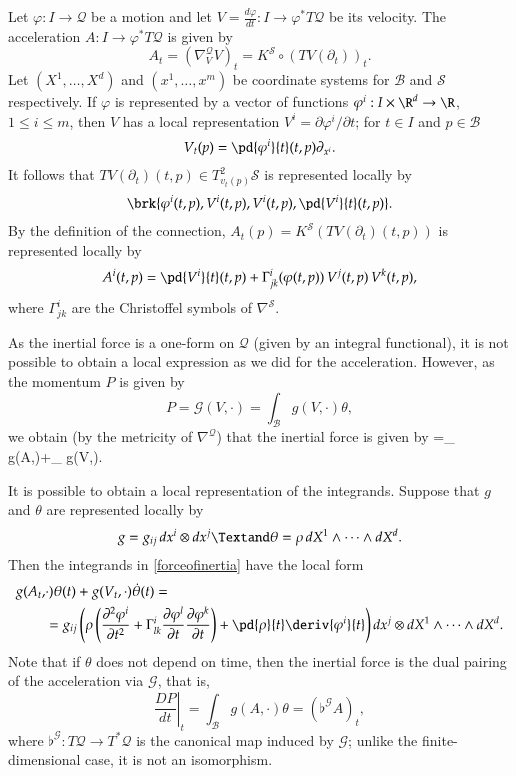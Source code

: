 \documentclass[smallextended]{svjour3}
\begin{document}
Let ${\varphi}:I\to{\mathcal{Q}}$ be a motion and let $V=\frac{d{\varphi}}{dt}:I\to {\varphi}^*T{\mathcal{Q}}$ be its velocity.  The acceleration $A:I\to {\varphi}^*T{\mathcal{Q}}$ is given by 
\[
A_t=(\nabla^{\mathcal{Q}}_VV)_t=K^{\mathcal{S}}\circ (TV(\partial_t))_t.
\]
Let $(X^1,\dots,X^d)$ and $(x^1,\dots,x^m)$ be coordinate systems for ${\mathcal{B}}$ and ${\mathcal{S}}$ respectively.  If ${\varphi}$ is represented by a vector of functions ${\varphi}^i:I\times\R^d\to\R$, $1\leq i\leq m$,  then $V$ has a local representation $V^i=\partial{\varphi}^i/\partial t$; for $t\in I$ and $p\in{\mathcal{B}}$
\[
V_t(p)=\pd{{\varphi}^i}{t}(t,p)\partial_{x^i}.
\]
It follows that $TV(\partial_t)(t,p)\in T^2_{v_t(p)}{\mathcal{S}}$ is represented locally by 
\[
\brk{{\varphi}^i(t,p),V^i(t,p),V^i(t,p), \pd{V^i}{t}(t,p)}.
\]
By the definition of the connection, $A_t(p)=K^{\mathcal{S}}(TV(\partial_t)(t,p))$ is represented locally by
\[
A^i(t,p)=\pd{V^i}{t}(t,p)+\Gamma^i_{jk}({\varphi}(t,p))\, V^j(t,p)\, V^k(t,p),
\]
where $\Gamma^i_{jk}$ are the Christoffel symbols of $\nabla^{\mathcal{S}}$.

As the inertial force is a one-form on ${\mathcal{Q}}$ (given by an integral functional), it is not possible to obtain a local expression as we did for the acceleration. However, as the momentum $P$ is given by 
 \[
P={\mathcal{G}}(V,\cdot)=\int_{\mathcal{B}} g(V,\cdot)\theta,
\]
we obtain (by the metricity of $\nabla^{\mathcal{Q}}$) that  the inertial force is given by
\beq\label{forceofinertia}
=\int_{} g(A,\cdot)\theta+\int_{} g(V,\cdot)\dot{\theta}.
\eeq

It is possible to obtain a local representation of the integrands.
Suppose  that $g$ and $\theta$ are represented locally by 
\[
g=g_{ij}\, dx^i\otimes dx^j 
\Textand 
\theta=\rho \, dX^1\wedge\cdots\wedge dX^d.
\]
Then the integrands in \eqref{forceofinertia}
have the local form 
\[
\begin{split}
g(A_t,&\cdot)\theta(t)+g(V_t,\cdot)\dot{\theta}(t)=\\
&=g_{ij}\left(\rho\left( \frac{\partial^2{\varphi}^i}{\partial t^2}+\Gamma^i_{lk}\frac{\partial{\varphi}^l}{\partial t}   \frac{\partial{\varphi}^k}{\partial t}\right) +\pd{\rho}{t} \deriv{{\varphi}^i}{t}     \right)dx^j\otimes dX^1\wedge\cdots\wedge dX^d.
\end{split}
\]
Note that if $\theta$ does not depend on time, then the inertial force is the dual pairing of the acceleration via ${\mathcal{G}}$, that is,
 \[
 \left.\frac{DP}{dt}\right|_t=\int_{\mathcal{B}} g(A,\cdot)\theta=(\flat^{\mathcal{G}} A)_t,
 \]
 where $\flat^{\mathcal{G}}:T{\mathcal{Q}}\to T^*{\mathcal{Q}}$ is the canonical map induced by ${\mathcal{G}}$; unlike the finite-dimensional case, it is not an isomorphism.
\end{document}
